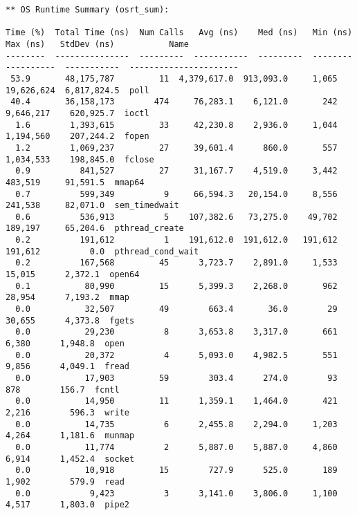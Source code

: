 \documentclass{article}
\begin{document}
\begin{lstlisting}[basicstyle=\tiny]
 ** OS Runtime Summary (osrt_sum):

Time (%)  Total Time (ns)  Num Calls   Avg (ns)    Med (ns)   Min (ns)   Max (ns)   StdDev (ns)           Name         
--------  ---------------  ---------  -----------  ---------  --------  ----------  -----------  ----------------------
 53.9       48,175,787         11  4,379,617.0  913,093.0     1,065  19,626,624  6,817,824.5  poll                  
 40.4       36,158,173        474     76,283.1    6,121.0       242   9,646,217    620,925.7  ioctl                 
  1.6        1,393,615         33     42,230.8    2,936.0     1,044   1,194,560    207,244.2  fopen                 
  1.2        1,069,237         27     39,601.4      860.0       557   1,034,533    198,845.0  fclose                
  0.9          841,527         27     31,167.7    4,519.0     3,442     483,519     91,591.5  mmap64                
  0.7          599,349          9     66,594.3   20,154.0     8,556     241,538     82,071.0  sem_timedwait         
  0.6          536,913          5    107,382.6   73,275.0    49,702     189,197     65,204.6  pthread_create        
  0.2          191,612          1    191,612.0  191,612.0   191,612     191,612          0.0  pthread_cond_wait     
  0.2          167,568         45      3,723.7    2,891.0     1,533      15,015      2,372.1  open64                
  0.1           80,990         15      5,399.3    2,268.0       962      28,954      7,193.2  mmap                  
  0.0           32,507         49        663.4       36.0        29      30,655      4,373.8  fgets                 
  0.0           29,230          8      3,653.8    3,317.0       661       6,380      1,948.8  open                  
  0.0           20,372          4      5,093.0    4,982.5       551       9,856      4,049.1  fread                 
  0.0           17,903         59        303.4      274.0        93         878        156.7  fcntl                 
  0.0           14,950         11      1,359.1    1,464.0       421       2,216        596.3  write                 
  0.0           14,735          6      2,455.8    2,294.0     1,203       4,264      1,181.6  munmap                
  0.0           11,774          2      5,887.0    5,887.0     4,860       6,914      1,452.4  socket                
  0.0           10,918         15        727.9      525.0       189       1,902        579.9  read                  
  0.0            9,423          3      3,141.0    3,806.0     1,100       4,517      1,803.0  pipe2                 

\end{lstlisting}
\end{document}
